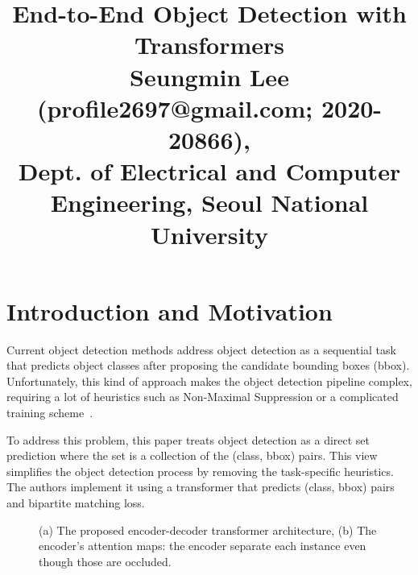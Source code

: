 \documentclass[10pt,twocolumn,letterpaper]{article}
\begin{document}
\title{End-to-End Object Detection with Transformers\\ {\rm {\normalsize Seungmin Lee (profile2697@gmail.com; 2020-20866), \\Dept. of Electrical and Computer Engineering, Seoul National University}}}   %

\maketitle
\thispagestyle{empty}

\section{Introduction and Motivation}
Current object detection methods address object detection as a sequential task that predicts object classes after proposing the candidate bounding boxes (bbox). Unfortunately, this kind of approach makes the object detection pipeline complex, requiring a lot of heuristics such as Non-Maximal Suppression or a complicated training scheme~\cite{Faster}.

To address this problem, this paper treats object detection as a direct set prediction where the set is a collection of the (class, bbox) pairs. This view simplifies the object detection process by removing the task-specific heuristics. The authors implement it using a transformer that predicts (class, bbox) pairs and bipartite matching loss. 

\begin{figure}[b]
	\centering
	\caption{(a) The proposed encoder-decoder transformer architecture, (b) The encoder's attention maps: the encoder separate each instance even though those are occluded.}
	\label{fig:imgs}
\end{figure}
\vspace{-0.2cm}
\end{document}
